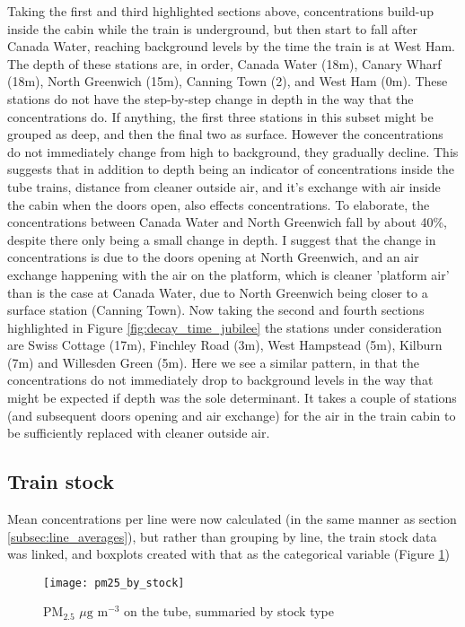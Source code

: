 Taking the first and third highlighted sections above, concentrations build-up inside the cabin while the train is underground, but then start to fall after Canada Water, reaching background levels by the time the train is at West Ham. The depth of these stations are, in order, Canada Water (18m), Canary Wharf (18m), North Greenwich (15m), Canning Town (2), and West Ham (0m). These stations do not have the step-by-step change in depth in the way that the concentrations do. If anything, the first three stations in this subset might be grouped as deep, and then the final two as surface. However the concentrations do not immediately change from high to background, they gradually decline. This suggests that in addition to depth being an indicator of concentrations inside the tube trains, distance from cleaner outside air, and it's exchange with air inside the cabin when the doors open, also effects concentrations. To elaborate, the concentrations between Canada Water and North Greenwich fall by about 40\%, despite there only being a small change in depth. I suggest that the change in concentrations is due to the doors opening at North Greenwich, and an air exchange happening with the air on the platform, which is cleaner 'platform air' than is the case at Canada Water, due to North Greenwich being closer to a surface station (Canning Town). 
Now taking the second and fourth sections highlighted in Figure \ref{fig:decay_time_jubilee} the stations under consideration are Swiss Cottage (17m), Finchley Road (3m), West Hampstead (5m), Kilburn (7m) and Willesden Green (5m). Here we see a similar pattern, in that the concentrations do not immediately drop to background levels in the way that might be expected if depth was the sole determinant. It takes a couple of stations (and subsequent doors opening and air exchange) for the air in the train cabin to be sufficiently replaced with cleaner outside air.

\subsection{Train stock}
\label{subsec:tube_train_stock}
Mean concentrations per line were now calculated (in the same manner as section \ref{subsec:line_averages}), but rather than grouping by line, the train stock data was linked, and boxplots created with that as the categorical variable (Figure \ref{fig:pm25_by_stock}) 

\begin{figure}[H]
\centering
\texttt{[image: pm25\_by\_stock]}
\caption{PM$_{2.5}$ $\mu \text{g m}^{-3}$ on the tube, summaried by stock type}
\label{fig:pm25_by_stock}
\end{figure}

